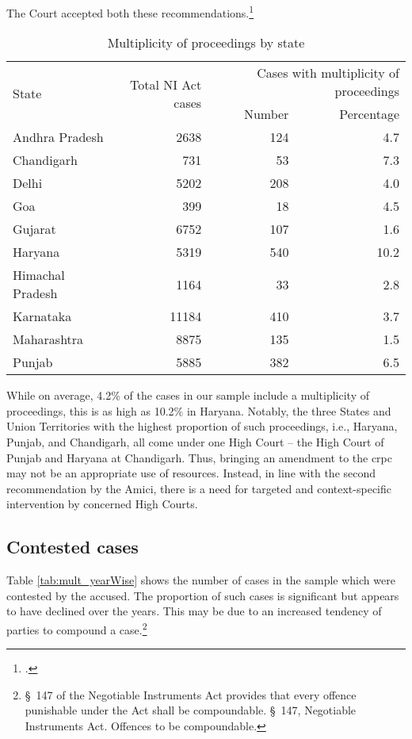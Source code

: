 The Court accepted both these recommendations.\footcite{sc2020_138}

\begin{longtable}[h!]{@{}lrrr@{}}
 \caption{Multiplicity of proceedings by state}\label{tab:state_multiplicity}\\
\toprule
  \multirow{2}{*}{State} &  \multirow{2}{*}{Total NI Act cases} & \multicolumn{2}{p{4cm}}{Cases with multiplicity of proceedings} \\
  \cmidrule{3-4}
        &        & Number & Percentage \\
\midrule
\endhead
Andhra Pradesh & 2638 & 124 & 4.7 \\
Chandigarh & 731 & 53 & 7.3 \\
Delhi & 5202 & 208 & 4.0 \\
Goa & 399 & 18 & 4.5 \\
Gujarat & 6752 & 107 & 1.6 \\
Haryana & 5319 & 540 & 10.2 \\
Himachal Pradesh & 1164 & 33 & 2.8 \\
Karnataka & 11184 & 410 & 3.7 \\
Maharashtra & 8875 & 135 & 1.5 \\
Punjab & 5885 & 382 & 6.5 \\
\bottomrule
\end{longtable}

While on average, 4.2\% of the cases in our sample include a multiplicity of proceedings, this is as high as 10.2\% in Haryana. Notably, the three States and Union Territories with the highest proportion of such proceedings, i.e., Haryana, Punjab, and Chandigarh, all come under one High Court -- the High Court of Punjab and Haryana at Chandigarh. Thus, bringing an amendment to the \gls{crpc} may not be an appropriate use of resources. Instead, in line with the second recommendation by the Amici, there is a need for targeted and context-specific intervention by concerned High Courts.

\subsection{Contested cases}
\label{sec:contested-cases}

Table \ref{tab:mult_yearWise} shows the number of cases in the sample which were contested by the accused. The proportion of such cases is significant but appears to have declined over the years. This may be due to an increased tendency of parties to compound a case.\footnote{\S~147 of the Negotiable Instruments Act provides that every offence punishable under the Act shall be compoundable. \S~147, Negotiable Instruments Act. Offences to be compoundable.}

